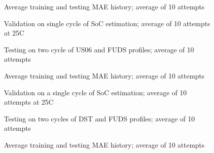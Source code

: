 \begin{figure*}[htbp]
    \centering
    \begin{subfigure}[b]{0.325\textwidth}
        \centering
        
        \caption{Average training and testing MAE history; average of 10 attempts}
    \end{subfigure}
    \hfill
    \begin{subfigure}[b]{0.325\textwidth}
        \centering
        
        \caption{Validation on single cycle of SoC estimation; average of 10 attempts at 25\textdegree{}C}
    \end{subfigure}
    \hfill
    \begin{subfigure}[b]{0.325\textwidth}
        \centering
        
        \caption{Testing on two cycle of US06 and FUDS profiles; average of 10 attempts}
        \label{subfig:Model-4res-DSTvsFUDS}
    \end{subfigure}
    \begin{subfigure}[b]{0.325\textwidth}
        \centering
        
        \caption{Average training and testing MAE history; average of 10 attempts}
    \end{subfigure}
    \hfill
    \begin{subfigure}[b]{0.325\textwidth}
        \centering
        
        \caption{Validation on a single cycle of SoC estimation; average of 10 attempts at 25\textdegree{}C}
    \end{subfigure}
    \hfill
    \begin{subfigure}[b]{0.325\textwidth}
        \centering
        
        \caption{Testing on two cycles of DST and FUDS profiles; average of 10 attempts}
    \end{subfigure}
    \begin{subfigure}[b]{0.325\textwidth}
        \centering
        
        \caption{Average training and testing MAE history; average of 10 attempts}

\end{subfigure}
\end{figure*}
